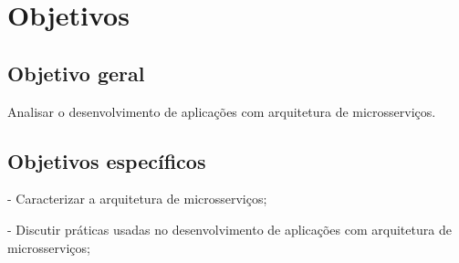 


\section{Objetivos}\label{sec-objetivos}


\subsection{Objetivo geral}\label{sec-objetivo-geral}

Analisar o desenvolvimento de aplicações com arquitetura de microsserviços.

\subsection{Objetivos específicos}\label{sec-objetivos-especificos}

- Caracterizar a arquitetura de microsserviços;

- Discutir práticas usadas no desenvolvimento de aplicações com arquitetura de microsserviços;

